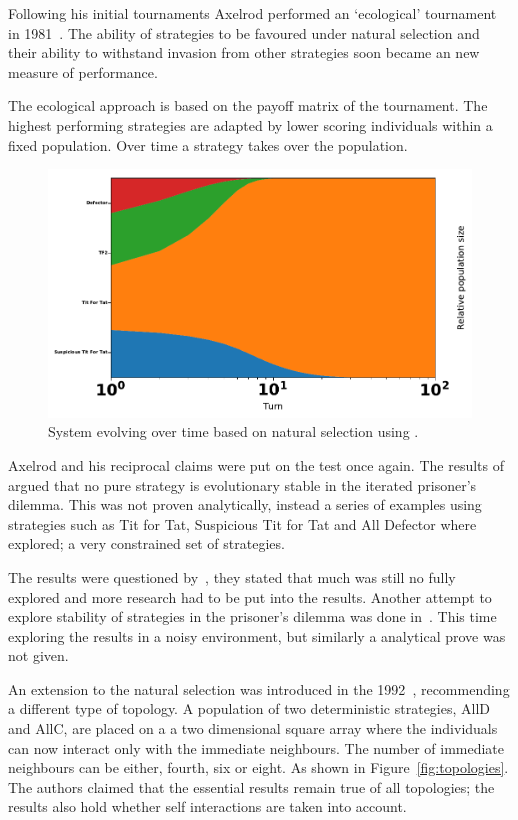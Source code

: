 \documentclass{article}
\begin{document}
Following his initial tournaments Axelrod performed an `ecological' tournament
in 1981~\cite{Axelrod1981}.  The ability of strategies to be favoured under
natural selection and their ability to withstand invasion from other strategies
soon became an new measure of performance. 

The ecological approach is based on the payoff matrix of the tournament.  The
highest performing strategies are adapted by lower scoring individuals
within a fixed population. Over time a strategy takes over the population.

\begin{figure}[!hbtp]
    \centering
    \includegraphics[width=.6\textwidth]{./assets/images/ecological.pdf}
    \caption{System evolving over time based on natural selection using
    \cite{axelrodproject}.}
    \label{fig:ecological.tournament}
\end{figure}

Axelrod and his reciprocal claims were put on the test once again. 
The results of~\cite{Boyd1987} argued that no pure strategy is evolutionary
stable in the iterated prisoner's dilemma. This was not proven analytically, instead
a series of examples using strategies such as Tit for Tat, Suspicious
Tit for Tat and All Defector where explored; a very constrained set of strategies.

The results were questioned by~\cite{May1987}, they stated that much was 
still no fully explored and more research had to be put into the results. 
Another attempt to explore stability of strategies in the prisoner's dilemma
was done in~\cite{Boyd1989}. This time exploring the results in a noisy
environment, but similarly a analytical prove was not given.

An extension to the natural selection was introduced in the 1992~\cite{Nowak1992},
recommending a different type of topology. A population of two deterministic
strategies, AllD and AllC, are placed on a a two dimensional square array
where the individuals can now interact only with the immediate neighbours.
The number of immediate neighbours can be either, fourth, six or eight. As
shown in Figure~\ref{fig:topologies}. The authors claimed that the essential
results remain true of all topologies; the results also hold whether self interactions
are taken into account. 
\end{document}
